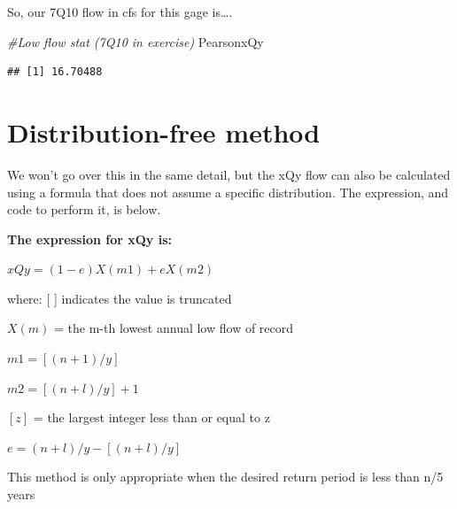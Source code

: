 \documentclass[
]{book}
\newenvironment{Shaded}{\begin{snugshade}}{\end{snugshade}}
\newcommand{\CommentTok}[1]{\textcolor[rgb]{0.56,0.35,0.01}{\textit{#1}}}
\newcommand{\NormalTok}[1]{#1}
\begin{document}
So, our 7Q10 flow in cfs for this gage is\ldots.

\begin{Shaded}
\begin{Highlighting}[]
\CommentTok{\#Low flow stat (7Q10 in exercise)}
\NormalTok{PearsonxQy}
\end{Highlighting}
\end{Shaded}

\begin{verbatim}
## [1] 16.70488
\end{verbatim}

\hypertarget{distribution-free-method}{%
\section{Distribution-free method}\label{distribution-free-method}}

We won't go over this in the same detail, but the xQy flow can also be calculated using a formula that does not assume a specific distribution. The expression, and code to perform it, is below.

\textbf{The expression for xQy is:}

\(xQy = (1-e) X(m1) + eX(m2)\)

where:
{[} {]} indicates the value is truncated

\(X(m)\) = the m-th lowest annual low flow of record

\(m1 = [(n+1)/y]\)

\(m2 = [(n+l)/y] + 1\)

\([z]\) = the largest integer less than or equal to z

\(e = (n+l)/y - [(n+l)/y]\)

This method is only appropriate when the desired return period is less than n/5 years
\end{document}

